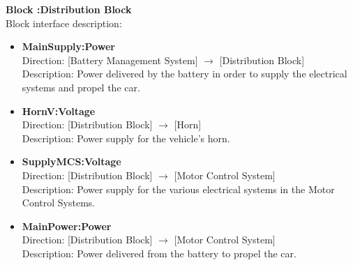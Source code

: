 \textbf{Block :Distribution Block}\\
Block interface description:
\begin{itemize}
	\item \textbf{MainSupply:Power}\\
	Direction: [Battery Management System] $\rightarrow$ [Distribution Block]\\
	Description: Power delivered by the battery in order to supply the electrical systems and propel the car.
	\item \textbf{HornV:Voltage}\\
	Direction: [Distribution Block] $\rightarrow$ [Horn]\\
	Description: Power supply for the vehicle's horn.
	\item \textbf{SupplyMCS:Voltage}\\
	Direction: [Distribution Block] $\rightarrow$ [Motor Control System]\\
	Description: Power supply for the various electrical systems in the Motor Control Systems.
	\item \textbf{MainPower:Power}\\
	Direction: [Distribution Block] $\rightarrow$ [Motor Control System]\\
	Description: Power delivered from the battery to propel the car.
\end{itemize}

